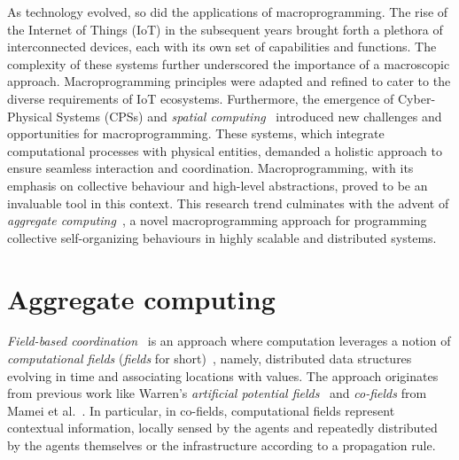 As technology evolved, so did the applications of macroprogramming. 
 The rise of the Internet of Things (IoT) in the subsequent years brought forth a plethora of interconnected devices, each with its own set of capabilities and functions. 
 The complexity of these systems further underscored the importance of a macroscopic approach. Macroprogramming principles were adapted and refined to cater to the diverse requirements of IoT ecosystems.
%
Furthermore, the emergence of Cyber-Physical Systems (CPSs) and \emph{spatial computing}~\cite{DBLP:journals/corr/abs-1202-5509} introduced new challenges and opportunities for macroprogramming. 
%
These systems, which integrate computational processes with physical entities,
 demanded a holistic approach to ensure seamless interaction and coordination. 
 Macroprogramming, with its emphasis on collective behaviour and high-level abstractions, 
 proved to be an invaluable tool in this context.
%
This research trend culminates with the advent of \emph{aggregate computing}~\cite{aggregatecomputing}, 
 a novel macroprogramming approach for programming collective self-organizing behaviours in highly scalable and distributed systems.
\section{Aggregate computing}
\emph{Field-based coordination}~\cite{DBLP:journals/jlap/ViroliBDACP19}
 is an approach
 where computation leverages
 a notion of \emph{computational fields} (\emph{fields} for short)~\cite{DBLP:conf/icra/Warren89,DBLP:journals/pervasive/MameiZL04,DBLP:journals/jlap/ViroliBDACP19}, 
 namely, distributed data structures evolving in time and associating locations with values.
%
The approach originates from previous work
 like
 Warren's \emph{artificial potential fields}~\cite{DBLP:conf/icra/Warren89}
 and
 \emph{co-fields} from Mamei et al.~\cite{DBLP:journals/pervasive/MameiZL04}.
%
In particular, in co-fields, computational fields represent contextual information, 
 locally sensed by the agents and repeatedly distributed by the agents themselves or the infrastructure according to a propagation rule.

